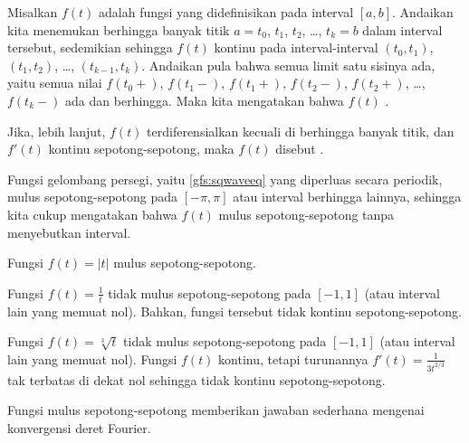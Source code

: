 Misalkan $f(t)$ adalah fungsi yang didefinisikan pada interval $[a,b]$.  Andaikan
kita menemukan berhingga banyak titik
$a=t_0$, $t_1$, $t_2$, \ldots, $t_k=b$ dalam
interval tersebut, sedemikian sehingga $f(t)$ kontinu
pada interval-interval
$(t_0,t_1)$,
$(t_1,t_2)$, \ldots,
$(t_{k-1},t_k)$.
Andaikan pula bahwa semua limit satu sisinya ada, yaitu
semua nilai
$f(t_0+)$,
$f(t_1-)$,
$f(t_1+)$,
$f(t_2-)$,
$f(t_2+)$,
\ldots,
$f(t_k-)$
ada dan berhingga.
Maka
kita mengatakan bahwa $f(t)$ \emph{}.

Jika, lebih lanjut, $f(t)$ terdiferensialkan kecuali di berhingga banyak titik,
dan $f'(t)$ kontinu sepotong-sepotong, maka
$f(t)$ disebut \emph{}.

\begin{example}
Fungsi gelombang persegi, yaitu \eqref{gfs:sqwaveeq} yang diperluas secara periodik,
mulus sepotong-sepotong pada $[-\pi,\pi]$ atau interval berhingga lainnya, sehingga
kita cukup mengatakan bahwa $f(t)$
mulus sepotong-sepotong tanpa menyebutkan interval.
\end{example}

\begin{example}
Fungsi $f(t) = \lvert t \lvert$
mulus sepotong-sepotong.
\end{example}

\begin{example}
Fungsi $f(t) = \frac{1}{t}$ tidak mulus sepotong-sepotong pada
$[-1,1]$ (atau interval lain yang memuat nol).  Bahkan, fungsi tersebut tidak
kontinu sepotong-sepotong.
\end{example}

\begin{example}
Fungsi $f(t) = \sqrt[3]{t}$ tidak mulus sepotong-sepotong pada
$[-1,1]$ (atau interval lain yang memuat nol).
Fungsi $f(t)$ kontinu, tetapi
turunannya $f'(t) = \frac{1}{3t^{2/3}}$ tak terbatas di dekat nol sehingga tidak kontinu
sepotong-sepotong.
\end{example}

Fungsi mulus sepotong-sepotong memberikan jawaban sederhana mengenai konvergensi
deret Fourier.

